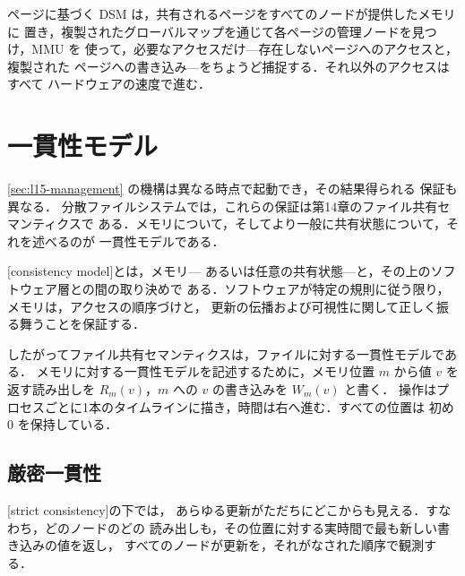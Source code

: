 \documentclass[../main.tex]{subfiles}
\begin{document}
\begin{keypoint}
  ページに基づく DSM は，共有されるページをすべてのノードが提供したメモリに
  置き，複製されたグローバルマップを通じて各ページの管理ノードを見つけ，MMU を
  使って，必要なアクセスだけ---存在しないページへのアクセスと，複製された
  ページへの書き込み---をちょうど捕捉する．それ以外のアクセスはすべて
  ハードウェアの速度で進む．
\end{keypoint}

\section{一貫性モデル}
\label{sec:l15-models}

\cref{sec:l15-management} の機構は異なる時点で起動でき，その結果得られる
保証も異なる．
分散ファイルシステムでは，これらの保証は第14章のファイル共有セマンティクスで
ある．メモリについて，そしてより一般に共有状態について，それを述べるのが
一貫性モデルである．

\begin{definition}[一貫性モデル]
  [consistency model]とは，メモリ---
  あるいは任意の共有状態---と，その上のソフトウェア層との間の取り決めで
  ある．ソフトウェアが特定の規則に従う限り，メモリは，アクセスの順序づけと，
  更新の伝播および可視性に関して正しく振る舞うことを保証する．
\end{definition}

したがってファイル共有セマンティクスは，ファイルに対する一貫性モデルである．
メモリに対する一貫性モデルを記述するために，メモリ位置 $m$ から値 $v$ を
返す読み出しを $R_{m}(v)$，$m$ への $v$ の書き込みを $W_{m}(v)$ と書く．
操作はプロセスごとに1本のタイムラインに描き，時間は右へ進む．すべての位置は
初め 0 を保持している．

\subsection{厳密一貫性}

\begin{definition}[厳密一貫性]
  [strict consistency]の下では，
  あらゆる更新がただちにどこからも見える．すなわち，どのノードのどの
  読み出しも，その位置に対する実時間で最も新しい書き込みの値を返し，
  すべてのノードが更新を，それがなされた順序で観測する．
\end{definition}
\end{document}
